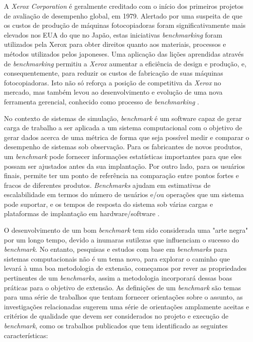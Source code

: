 A \textit{Xerox Corporation} é geralmente creditado com o início dos primeiros projetos de avaliação de desempenho global, em 1979. Alertado por uma suspeita de que os custos de produção de máquinas fotocopiadoras foram significativamente mais elevados nos EUA do que no Japão, estas iniciativas \textit{benchmarking} foram utilizados pela Xerox para obter direitos quanto aos materiais, processos e métodos utilizados pelos japoneses. Uma aplicação das lições aprendidas através de \textit{benchmarking} permitiu a \textit{Xerox} aumentar a eficiência de design e produção, e, consequentemente, para reduzir os custos de fabricação de suas máquinas fotocopiadoras. Isto não só reforça a posição de competitiva da \textit{Xerox} no mercado, mas também levou ao desenvolvimento e evolução de uma nova ferramenta gerencial, conhecido como processo de \textit{benchmarking} \cite{Mahmoud2002}.

No contexto de sistemas de simulação, \textit{benchmark} é um software capaz de gerar carga de trabalho a ser aplicada a um sistema computacional com o objetivo de gerar dados acerca de uma métrica de forma que seja possível medir e comparar o desempenho de sistemas sob observação. Para os fabricantes de novos produtos, um \textit{benchmark} pode fornecer informações estatísticas importantes para que eles possam ser ajustados antes da sua implantação. Por outro lado, para os usuários finais, permite ter um ponto de referência na comparação entre pontos fortes e fracos de diferentes produtos. \textit{Benchmarks} ajudam em estimativas de escalabilidade em termos do número de usuários e/ou operações que um sistema pode suportar, e os tempos de resposta do sistema sob várias cargas e plataformas de implantação em hardware/software \cite{Jutla1999}.

O desenvolvimento de um bom \textit{benchmark} tem sido considerada uma "arte negra" por um longo tempo, devido a inumaras sutilezas que influenciam o sucesso do \textit{benchmark}. 
No entanto, pesquisas e estudos com base em \textit{benchmarks} para sistemas computacionais não é um tema novo, para explorar o caminho que levará à uma boa metodologia de extensão, começamos por rever as propriedades pertinentes de um \textit{benchmarks}, assim a metodologia incorporará dessas boas práticas para o objetivo de extensão.
As definições de um \textit{benchmark} são temas para uma série de trabalhos que tentam fornecer orientações sobre o assunto, as investigações relacionadas sugerem uma série de orientações amplamente aceitas e critérios de qualidade que devem ser considerados no projeto e execução de \textit{benchmark}, como os trabalhos publicados \cite{Kistowski2015, Chen2014, Folkerts2013, Marco2012, Huppler2009, Gray1992} que tem identificado as seguintes características:


